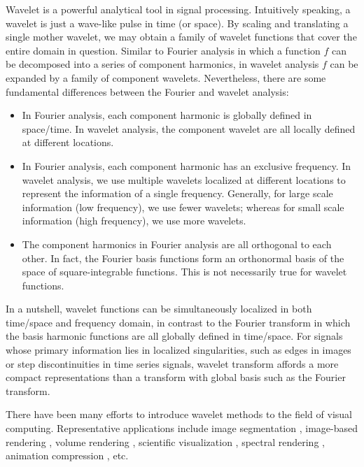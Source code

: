 Wavelet is a powerful analytical tool in signal processing. Intuitively speaking,
a wavelet is just a wave-like pulse in time (or space). By scaling and translating
a single mother wavelet, we may obtain a family of wavelet functions that cover
the entire domain in question. Similar to Fourier analysis in which a function $f$
can be decomposed into a series of component harmonics, in wavelet analysis $f$
can be expanded by a family of component wavelets. Nevertheless, there are some
fundamental differences between the Fourier and wavelet analysis:

\begin{itemize}
\item In Fourier analysis, each component harmonic is globally defined in space/time. In wavelet analysis, the component wavelet are all locally defined at different locations.
\item In Fourier analysis, each component harmonic has an exclusive frequency. In wavelet analysis, we use multiple wavelets localized at different locations to represent the information of a single frequency. Generally, for large scale information (low frequency), we use fewer wavelets; whereas for small scale information (high frequency), we use more wavelets.
\item The component harmonics in Fourier analysis are all orthogonal to each other. In fact, the Fourier basis functions form an orthonormal basis of the space of square-integrable functions. This is not necessarily true for wavelet functions.
\end{itemize}

In a nutshell, wavelet functions can be simultaneously localized in both time/space and frequency domain,
in contrast to the Fourier transform in which the basis harmonic functions are all globally defined
in time/space. For signals whose primary information lies in localized singularities, such as edges
in images or step discontinuities in time series signals, wavelet transform affords a more compact
representations than a transform with global basis such as the Fourier transform.

There have been many efforts to introduce wavelet methods to the field of visual computing.
Representative applications include image segmentation \cite{Figueiredo:2005:CVPR},
image-based rendering \cite{Overbeck:2009:TOG}, volume rendering \cite{Lippert:1995},
scientific visualization \cite{Cracium:2005:TVCG}, spectral rendering \cite{Iehl:2000:CGF},
animation compression \cite{Payan:2007:CG}, etc.

